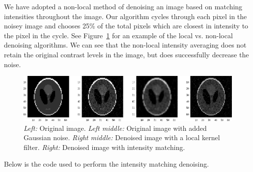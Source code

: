 \documentclass{article}
\begin{document}
\begin{homeworkProblem}

    We have adopted a non-local method of denoising an image based on matching
    intensities throughout the image. Our algorithm cycles through each pixel
    in the noisey image and chooses 25\% of the total pixels which are closest
    in intensity to the pixel in the cycle. See Figure~\ref{fig:images} for an
    example of the local vs. non-local denoising algorithms. We can see that
    the non-local intensity averaging does not retain the original contrast
    levels in the image, but does successfully decrease the noise.

    \begin{figure}[!ht]
        
        \includegraphics{noisey_images.png}

        \caption{\label{fig:images} {\it Left:} Original image. {\it Left
            middle:} Original image with added Gaussian noise. {\it Right
            middle:} Denoised image with a local kernel filter. {\it Right:}
        Denoised image with intensity matching.}

    \end{figure}

    \clearpage
    Below is the code used to perform the intensity matching denoising.
    

\end{homeworkProblem}
\end{document}
